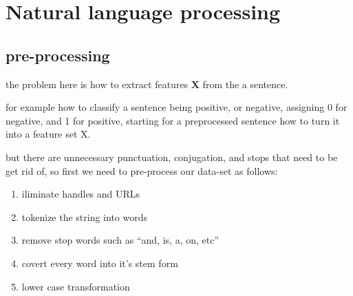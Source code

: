 \documentclass[4apaper,12pt]{book}
\begin{document}
\chapter{Natural language processing}
\section{pre-processing}
\begin{description}
\item the problem here is how to extract features $\mathbf{X}$ from the a sentence.
\item for example how to classify a sentence being positive, or negative, assigning 0 for negative, and 1 for positive, starting for a preprocessed sentence how to turn it into a feature set X.
  \item but there are unnecessary punctuation, conjugation, and stops that need to be get rid of, so first we need to pre-process our data-set as follows:
  \begin{enumerate}
  \item iliminate handles and URLs
  \item tokenize the string into words
  \item remove stop words such as ``and, is, a, on, etc''
  \item covert every word into it's stem form
  \item lower case transformation
  \end{enumerate}

\end{description}
\end{document}

